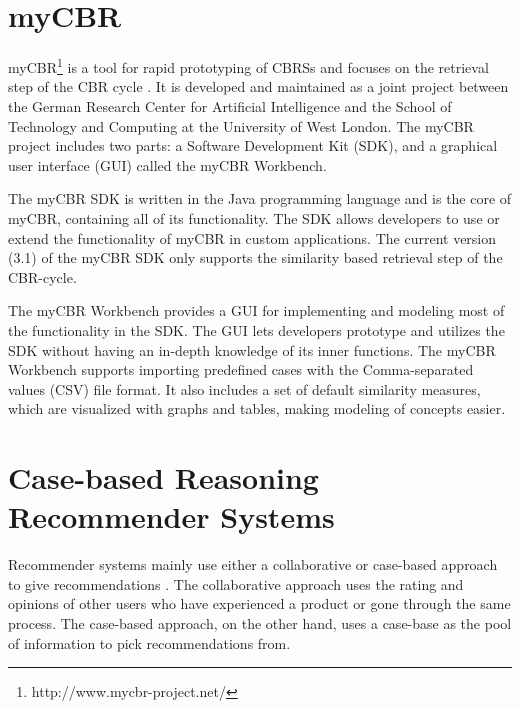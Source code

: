 \section{myCBR}

myCBR\footnote{http://www.mycbr-project.net/} is a tool for rapid prototyping of CBRSs and focuses on the retrieval step of the CBR cycle \cite{Stahl2008}. It is developed and maintained as a joint project between the German Research Center for Artificial Intelligence and the School of Technology and Computing at the University of West London. The myCBR project includes two parts: a Software Development Kit (SDK), and a graphical user interface (GUI) called the myCBR Workbench.

The myCBR SDK is written in the Java programming language and is the core of myCBR, containing all of its functionality. The SDK allows developers to use or extend the functionality of myCBR in custom applications. The current version (3.1) of the myCBR SDK only supports the similarity based retrieval step of the CBR-cycle.

The myCBR Workbench provides a GUI for implementing and modeling most of the functionality in the SDK. The GUI lets developers prototype and utilizes the SDK without having an in-depth knowledge of its inner functions. The myCBR Workbench supports importing predefined cases with the Comma-separated values (CSV) file format. It also includes a set of default similarity measures, which are visualized with graphs and tables, making modeling of concepts easier.

\section{Case-based Reasoning Recommender Systems}\label{sec:case_based_recommender_systems}

Recommender systems mainly use either a collaborative or case-based approach to give recommendations \cite{bridge2005case}. The collaborative approach uses the rating and opinions of other users who have experienced a product or gone through the same process. The case-based approach, on the other hand, uses a case-base as the pool of information to pick recommendations from.

